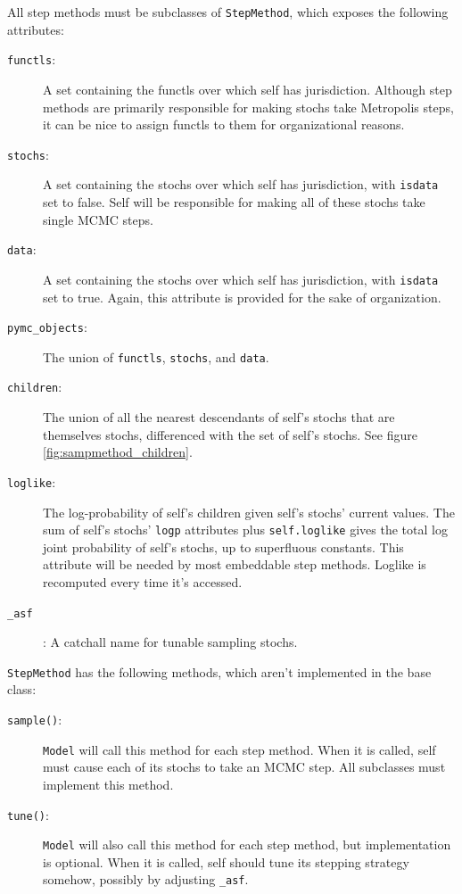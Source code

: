\documentclass[]{book}
\begin{document}
All step methods must be subclasses of \texttt{StepMethod}, which exposes the following attributes:
\begin{description}
    \item[\texttt{functls}:] A set containing the functls over which self has jurisdiction. Although step methods are primarily responsible for making stochs take Metropolis steps, it can be nice to assign functls to them for organizational reasons.
    \item[\texttt{stochs}:] A set containing the stochs over which self has jurisdiction, with \texttt{isdata} set to false. Self will be responsible for making all of these stochs take single MCMC steps.
    \item[\texttt{data}:] A set containing the stochs over which self has jurisdiction, with \texttt{isdata} set to true. Again, this attribute is provided for the sake of organization.
    \item[\texttt{pymc\_objects}:] The union of \texttt{functls}, \texttt{stochs}, and \texttt{data}.
    \item[\texttt{children}:] The union of all the nearest descendants of self's stochs that are themselves stochs, differenced with the set of self's stochs. See figure \ref{fig:sampmethod_children}.
    \item[\texttt{loglike}:] The log-probability of self's children given self's stochs' current values. The sum of self's stochs' \texttt{logp} attributes plus \texttt{self.loglike}  gives the total log joint probability of self's stochs, up to superfluous constants. This attribute will be needed by most embeddable step methods. Loglike is recomputed every time it's accessed.
    \item[\texttt{\_asf}]: A catchall name for tunable sampling stochs.
\end{description}

\texttt{StepMethod} has the following methods, which aren't implemented in the base class:
\begin{description}
    \item[\texttt{sample()}:] \texttt{Model} will call this method for each step method. When it is called, self must cause each of its stochs to take an MCMC step. All subclasses must implement this method.
    \item[\texttt{tune()}:] \texttt{Model} will also call this method for each step method, but implementation is optional. When it is called, self should tune its stepping strategy somehow, possibly by adjusting \texttt{\_asf}.
\end{description}
\end{document}
